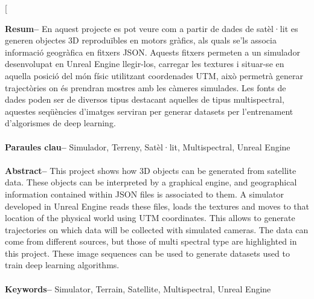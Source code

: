 \documentclass[10pt,a4paper,twocolumn,twoside]{article}
\begin{document}
\twocolumn[\begin{@twocolumnfalse}

{
\vspace*{-1cm}
\maketitle
}

\thispagestyle{primerapagina}
\begin{center}
\parbox{0.915\textwidth}
{\sffamily\small
\textbf{Resum--} En aquest projecte es pot veure com a partir de dades de satèl·lit es generen objectes 3D reproduïbles en motors gràfics, als quals se'ls associa informació geogràfica en fitxers JSON. Aquests fitxers permeten a un simulador desenvolupat en Unreal Engine llegir-los, carregar les textures i situar-se en aquella posició del món físic utilitzant coordenades UTM, això permetrà generar trajectòries on és prendran mostres amb les càmeres simulades. Les fonts de dades poden ser de diversos tipus destacant aquelles de tipus multispectral, aquestes seqüències d'imatges serviran per generar datasets per l'entrenament d'algorismes de deep learning.
\\
\\
\textbf{Paraules clau-- }
Simulador, Terreny, Satèl·lit, Multispectral, Unreal Engine\\
\\
\textbf{Abstract--}  This project shows how 3D objects can be generated from satellite data. These objects can be interpreted by a graphical engine, and geographical information contained within JSON files is associated to them. A simulator developed in Unreal Engine reads these files, loads the textures and moves to that location of the physical world using UTM coordinates. This allows to generate trajectories on which data will be collected with simulated cameras. The data can come from different sources, but those of multi spectral type are highlighted in this project. These image sequences can be used to generate datasets used to train deep learning algorithms.
\\
\\
\textbf{Keywords-- }
Simulator, Terrain, Satellite, Multispectral, Unreal Engine\\
\\
}


\end{center}
\end{@twocolumnfalse}
\end{document}
